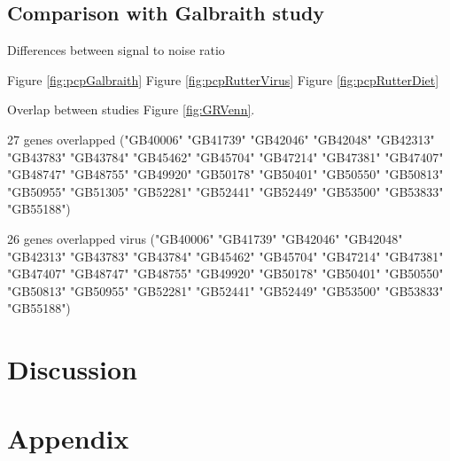 \documentclass[11pt,a4paper,oldfontcommands,openany]{memoir}
\numberwithin{equation}{section} %
\begin{document}
\subsection{Comparison with Galbraith study}

Differences between signal to noise ratio

Figure \ref{fig:pcpGalbraith}
Figure \ref{fig:pcpRutterVirus}
Figure \ref{fig:pcpRutterDiet}

Overlap between studies Figure \ref{fig:GRVenn}.

27 genes overlapped ("GB40006" "GB41739" "GB42046" "GB42048" "GB42313" "GB43783" "GB43784" "GB45462" "GB45704" "GB47214" "GB47381" "GB47407" "GB48747" "GB48755" "GB49920" "GB50178" "GB50401" "GB50550" "GB50813" "GB50955" "GB51305" "GB52281" "GB52441" "GB52449" "GB53500" "GB53833" "GB55188")

26 genes overlapped virus ("GB40006" "GB41739" "GB42046" "GB42048" "GB42313" "GB43783" "GB43784" "GB45462" "GB45704" "GB47214" "GB47381" "GB47407" "GB48747" "GB48755" "GB49920" "GB50178" "GB50401" "GB50550" "GB50813" "GB50955" "GB52281" "GB52441" "GB52449" "GB53500" "GB53833" "GB55188")

\section{Discussion}








\section{Appendix}
\end{document}
